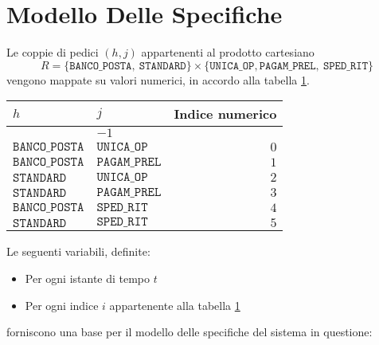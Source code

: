 \section{Modello Delle Specifiche}\label{sec:modello-specifiche}
Le coppie di pedici $(h,j)$ appartenenti al prodotto cartesiano 
\begin{equation}
R = \lbrace \mathtt{BANCO\_POSTA},\ \mathtt{STANDARD}\rbrace \times \lbrace \mathtt{UNICA\_OP},\mathtt{PAGAM\_PREL},\ \mathtt{SPED\_RIT} \rbrace
\end{equation}
vengono mappate su valori numerici, in accordo alla tabella \ref{table:modello-specifiche-1}.
\begin{table}[ht]
\centering
{\tablecolors
\begin{tabular}{| l | l | r |}
\hline
$h$ & $j$ & Indice numerico\\
\hline
\rowcolor{airforceblue!50}
\multicolumn{2}{| c |}{$\mathtt{IDLE}$} & $-1$\\
\hline
$\mathtt{BANCO\_POSTA}$ & $\mathtt{UNICA\_OP}$ & $0$\\
\hline
$\mathtt{BANCO\_POSTA}$ & $\mathtt{PAGAM\_PREL}$ & $1$\\
\hline
$\mathtt{STANDARD}$ & $\mathtt{UNICA\_OP}$ & $2$\\
\hline
$\mathtt{STANDARD}$ & $\mathtt{PAGAM\_PREL}$ & $3$\\
\hline
$\mathtt{BANCO\_POSTA}$ & $\mathtt{SPED\_RIT}$ & $4$\\
\hline
$\mathtt{STANDARD}$ & $\mathtt{SPED\_RIT}$ & $5$\\
\hline
\end{tabular}}
\label{table:modello-specifiche-1}
\end{table}
\newpage
Le seguenti variabili, definite:
\begin{itemize}
\item Per ogni istante di tempo $t$
\item Per ogni indice $i$ appartenente alla tabella \ref{table:modello-specifiche-1}
\end{itemize}
forniscono una base per il modello delle specifiche del sistema in questione:
